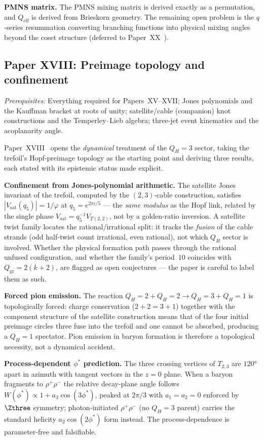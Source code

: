 \documentclass[11pt,a4paper]{article}
\newcommand{\vp}{\varphi}
\begin{document}
\textbf{PMNS matrix.} The PMNS mixing matrix is derived exactly as a
permutation, and $Q_{\mathrm{eff}}$ is derived from Brieskorn geometry.
The remaining open problem is the $q$-series resummation converting
branching functions into physical mixing angles beyond the coset
structure (deferred to Paper~XX~\cite{Paper20}).

\subsection{Paper XVIII: Preimage topology and confinement}

\textit{Prerequisites:} Everything required for Papers~XV--XVII; Jones
polynomials and the Kauffman bracket at roots of unity; satellite/cable
(companion) knot constructions and the Temperley--Lieb algebra; three-jet
event kinematics and the acoplanarity angle.

Paper~XVIII~\cite{Paper18} opens the \emph{dynamical} treatment of the $Q_H=3$
sector, taking the trefoil's Hopf-preimage topology as the starting point and
deriving three results, each stated with its epistemic status made explicit.

\textbf{Confinement from Jones-polynomial arithmetic.}
The satellite Jones invariant of the trefoil, computed by the $(2,3)$-cable
construction, satisfies $|V_{\mathrm{sat}}(q_5)|=1/\vp$ at $q_5=e^{2\pi i/5}$
--- the \emph{same modulus} as the Hopf link, related by the single phase
$V_{\mathrm{sat}}=q_5^{-1}V_{T(2,2)}$, not by a golden-ratio inversion. A
satellite twist family locates the rational/irrational split: it tracks the
\emph{fusion} of the cable strands (odd half-twist count irrational, even
rational), not which $Q_H$ sector is involved. Whether the physical formation
path passes through the rational unfused configuration, and whether the family's
period~$10$ coincides with $Q_{\mathrm{gr}}=2(k+2)$, are flagged as open
conjectures --- the paper is careful to label them as such.

\textbf{Forced pion emission.}
The reaction $Q_H{=}2+Q_H{=}2\to Q_H{=}3+Q_H{=}1$ is topologically forced:
charge conservation ($2+2=3+1$) together with the component structure of the
satellite construction means that of the four initial preimage circles three
fuse into the trefoil and one cannot be absorbed, producing a $Q_H=1$ spectator.
Pion emission in baryon formation is therefore a topological necessity, not a
dynamical accident.

\textbf{Process-dependent $\phi^*$ prediction.}
The three crossing vertices of $T_{2,3}$ are $120°$ apart in azimuth with
tangent vectors in the $z=0$ plane. When a baryon fragments to $\rho^+\rho^-$
the relative decay-plane angle follows $W(\phi^*)\propto1+a_3\cos(3\phi^*)$,
peaked at $2\pi/3$ with $a_1=a_2=0$ enforced by $\Zthree$ symmetry;
photon-initiated $\rho^+\rho^-$ (no $Q_H=3$ parent) carries the standard
helicity $a_2\cos(2\phi^*)$ form instead. The process-dependence is
parameter-free and falsifiable.
\end{document}
